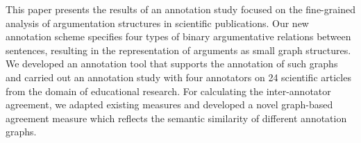 This paper presents the results of an annotation study focused on the fine-grained analysis of argumentation structures in scientific publications. Our new annotation scheme specifies four types of binary argumentative relations between sentences, resulting in the representation of arguments as small graph structures. We developed an annotation tool that supports the annotation of such graphs and carried out an annotation study with four annotators on 24 scientific articles from the domain of educational research. For calculating the inter-annotator agreement, we adapted existing measures and developed a novel graph-based agreement measure which reflects the semantic similarity of different annotation graphs.
